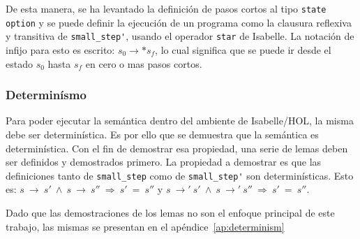De esta manera, se ha levantado la definición de pasos cortos al tipo \verb|state option| y se puede definir la ejecución de un programa como la clausura reflexiva y transitiva de \verb|small_step'|, usando el operador \verb|star| de Isabelle.
La notación de infijo para esto es escrito: $s_{0} \rightarrow* s_{f}$, lo cual significa que se puede ir desde el estado $s_{0}$ hasta $s_{f}$ en cero o mas pasos cortos.

\subsubsection*{Determinísmo}

Para poder ejecutar la semántica dentro del ambiente de Isabelle/HOL, la misma debe ser determinística.
Es por ello que se demuestra que la semántica es determinística.
Con el fin de demostrar esa propiedad, una serie de lemas deben ser definidos y demostrados primero.
La propiedad a demostrar es que las definiciones tanto de \verb|small_step| como de \verb|small_step'| son determinísticas.
Esto es: $s\ \rightarrow\ s'\ \wedge\ s\ \rightarrow\ s''\ \Longrightarrow\ s'\ =\ s''$ y $s\ \rightarrow'\ s'\ \wedge\ s\ \rightarrow'\ s''\ \Longrightarrow\ s'\ =\ s''$.

Dado que las demostraciones de los lemas no son el enfoque principal de este trabajo, las mismas se presentan en el apéndice~\ref{ap:determinism}


